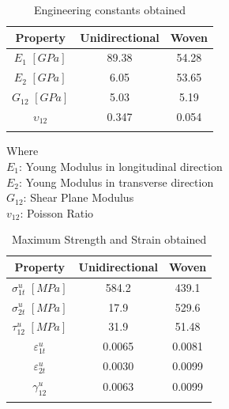\begin{table}[H]
\caption{Engineering constants obtained}  %
\label{tab:1}       %
\begin{center}
\begin{tabular}{ccc}
\hline\noalign{\smallskip}
Property & Unidirectional & Woven  \\
\hline\noalign{\smallskip}\hline\noalign{\smallskip}
$E_1$ $[GPa]$& 89.38 & 54.28 \\
$E_2$ $[GPa]$& 6.05 & 53.65 \\
$G_{12}$ $[GPa]$& 5.03 & 5.19 \\
$\upsilon_{12}$& 0.347 & 0.054\\
\noalign{\smallskip}\hline
\end{tabular}
\end{center}
\end{table}


Where\\
$E_1$: Young Modulus in longitudinal direction\\
$E_2$: Young Modulus in transverse direction\\
$G_{12}$: Shear Plane Modulus \\
$v_{12}$: Poisson Ratio\\

\begin{table}[H]
\caption{Maximum Strength and Strain obtained}  %
\label{tab:2}       %
\begin{center}
\begin{tabular}{ccc}
\hline\noalign{\smallskip}
Property & Unidirectional & Woven  \\
\hline\noalign{\smallskip}\hline\noalign{\smallskip}
$\sigma_{1t}^u$ $[MPa]$& 584.2 & 439.1 \\
$\sigma_{2t}^u$ $[MPa]$& 17.9 & 529.6 \\
$\tau_{12}^u$ $[MPa]$& 31.9 & 51.48 \\
$\varepsilon_{1t}^u$& 0.0065 & 0.0081\\
$\varepsilon_{2t}^u$& 0.0030 & 0.0099\\
$\gamma_{12}^u$& 0.0063 & 0.0099\\
\noalign{\smallskip}\hline
\end{tabular}
\end{center}
\end{table}\\


